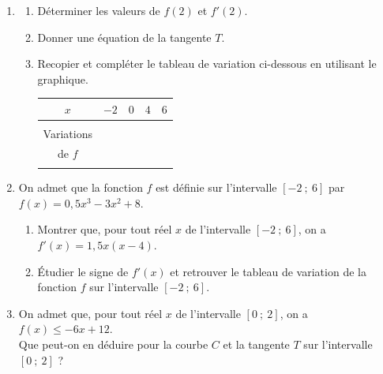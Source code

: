 \begin{enumerate}
\item 
\begin{enumerate}
\item Déterminer les valeurs de $f(2)$ et $f'(2)$.
\item Donner une équation de la tangente $T$.
\item Recopier et compléter le tableau de variation ci-dessous en utilisant le graphique.

\begin{center}
\setlength{\tabcolsep}{18pt}
\begin{tabular}{|c|cccc|}
\hline
$x$ & $-2$ & $0$ & $4$ & $6$ \\
\hline
 & & & & \\
Variations & & & & \\
de $f$ & & & & \\
 & & & & \\
\hline
\end{tabular}
\end{center}
\end{enumerate}

\item On admet que la fonction $f$ est définie sur l'intervalle $[-2~;~6]$ par $f(x) = 0,5x^3 - 3x^2 + 8$.
\begin{enumerate}
\item Montrer que, pour tout réel $x$ de l'intervalle $[-2~;~6]$, on a $f'(x) = 1,5x(x - 4)$.
\item Étudier le signe de $f'(x)$ et retrouver le tableau de variation de la fonction $f$ sur l'intervalle $[-2~;~6]$.
\end{enumerate}

\item On admet que, pour tout réel $x$ de l'intervalle $[0~;~2]$, on a $f(x) \leq -6x + 12$. \\
Que peut-on en déduire pour la courbe $C$ et la tangente $T$ sur l'intervalle $[0~;~2]$ ?
\end{enumerate}
